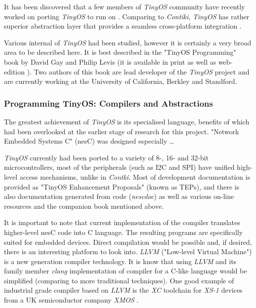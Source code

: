   It has been discovered that a few members of \emph{TinyOS} community
 have recently worked on porting \emph{TinyOS} to run on 
 \cite{tinyos:arch:rfa1-p1,tinyos:arch:rfa1-p2}. Comparing to \emph{Contiki},
 \emph{TinyOS} has rather superior abstraction layer that provides a seamless 
 cross-platform integration \cite{tinyos:tepXXX,tinyos:tepYYY,tinyos:tepZZZ}.
 
  Various internal of \emph{TinyOS} had been studied, however it is
 certainly a very broad area to be described here. It is best described
 in the "TinyOS Programming" book by David Gay and Philip Levis (it is
 available in print as well as web-edition \cite{tinyos:book}). Two
 authors of this book are lead developer of the \emph{TinyOS} project
 and are currently working at the University of California, Berkley
 and Standford.

\subsubsection{Programming TinyOS: Compilers and Abstractions}

  The greatest achievement of \emph{TinyOS} is its specialised language,
 benefits of which had been overlooked at the earlier stage of research
 for this project. "Network Embedded Systems C" (nesC) was designed
 especially \dots

 \emph{TinyOS} currently had been ported to a variety of 8-, 16- and
 32-bit microcontrollers, most of the peripherals (such as I2C and SPI)
 have unified high-level access mechanisms, unlike in \emph{Contki}.
 Most of development documentation is provided as "TinyOS Enhancement
 Proposals" (known as TEPs), and there is also documentation generated
 from code (\emph{nescdoc}) as well as various on-line resources and
 the companion book mentioned above. %

 It is important to note that current implementation of the compiler
 translates higher-level nesC code into C language. The resulting
 programs are specifically suited for embedded devices. Direct
 compilation would be possible and, if desired, there is an interesting
 platform to look into. \emph{LLVM} ("Low-level Virtual Machine") is a
 new generation compiler technology. It is know that using \emph{LLVM}
 and its family member \emph{clang} implementation of compiler for
 a C-like language would be simplified (comparing to more traditional
 techniques). One good example of industrial grade compiler based on
 \emph{LLVM} is the \emph{XC} toolchain for \emph{XS-1} devices from
 a UK semiconductor company \emph{XMOS} \cite{paper:xmos:docs:xcc}.

